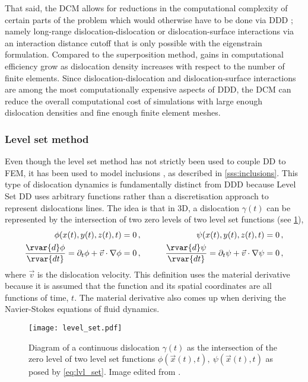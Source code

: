 That said, the DCM allows for reductions in the computational complexity of certain parts of the problem which would otherwise have to be done via DDD \cite{dcm}; namely long-range dislocation-dislocation or dislocation-surface interactions via an interaction distance cutoff that is only possible with the eigenstrain formulation. Compared to the superposition method, gains in computational efficiency grow as dislocation density increases with respect to the number of finite elements. Since dislocation-dislocation and dislocation-surface interactions are among the most computationally expensive aspects of DDD, the DCM can reduce the overall computational cost of simulations with large enough dislocation densities and fine enough finite element meshes.

\subsubsection{Level set method}
\label{sss:lvl_set}

Even though the level set method has not strictly been used to couple DD to FEM, it has been used to model inclusions \cite{ddd_inclusion_as_force}, as described in \cref{sss:inclusions}. This type of dislocation dynamics is fundamentally distinct from DDD because Level Set DD uses arbitrary functions rather than a discretisation approach to represent dislocations lines. The idea is that in 3D, a dislocation $ \gamma(t) $ can be represented by the intersection of two zero levels of two level set functions (see \cref{f:lvl_set_dd}),
\begin{subequations}\label{eq:lvl_set}
    \begin{align}
        \phi(x(t),y(t),z(t),t)                                                          & = 0\,, & \qquad
        \psi(x(t),y(t),z(t),t)                                                          & = 0\,,          \\
        \dfrac{\rvar{d} \phi}{\rvar{dt}} = \partial_{t}\phi + \vec{v} \cdot \nabla \phi & = 0\,, & \qquad
        \dfrac{\rvar{d} \psi}{\rvar{dt}} = \partial_{t}\psi + \vec{v} \cdot \nabla \psi & = 0\,,
    \end{align}
\end{subequations}
where $ \vec{v} $ is the dislocation velocity. This definition uses the material derivative because it is assumed that the function and its spatial coordinates are all functions of time, $ t $. The material derivative also comes up when deriving the Navier-Stokes equations of fluid dynamics.
\begin{figure}
    \centering
    \texttt{[image: level\_set.pdf]}
    \caption[Level set Dislocation Dynamics.]{Diagram of a continuous dislocation $ \gamma(t) $ as the intersection of the zero level of two level set functions $ \phi(\vec{x}(t),t),~\psi(\vec{x}(t),t) $ as posed by \cref{eq:lvl_set}. Image edited from \cite{lvl_set_dd}.}
    \label{f:lvl_set_dd}
\end{figure}

